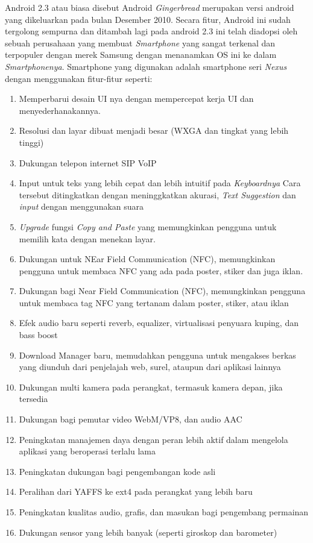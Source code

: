 \begin{enumerate}
Android 2.3 atau biasa disebut Android \textit{Gingerbread} merupakan versi android yang dikeluarkan pada bulan Desember 2010. Secara fitur, Android ini sudah tergolong sempurna dan ditambah lagi pada android 2.3 ini telah diadopsi oleh sebuah perusahaan yang membuat \textit{Smartphone} yang sangat terkenal dan terpopuler dengan merek Samsung dengan menanamkan OS ini ke dalam \textit{Smartphonenya}. Smartphone yang digunakan adalah smartphone seri \textit{Nexus} dengan menggunakan fitur-fitur seperti:
\begin{enumerate} 
    \item Memperbarui desain UI nya dengan mempercepat kerja UI dan menyederhanakannya.
    \item Resolusi dan layar dibuat menjadi besar (WXGA dan tingkat yang lebih tinggi)
    \item Dukungan telepon internet SIP VoIP
    \item Input untuk teks yang lebih cepat dan lebih intuitif pada \textit{Keyboardnya} Cara tersebut ditingkatkan dengan meninggkatkan akurasi, \textit{Text Suggestion} dan  \textit{input} dengan menggunakan suara
    \item \textit{Upgrade} fungsi \textit{Copy and Paste} yang memungkinkan pengguna untuk memilih kata dengan menekan layar. 
    \item Dukungan untuk NEar Field Communication (NFC), memungkinkan pengguna untuk membaca NFC yang ada pada poster, stiker dan juga iklan. 
    \item Dukungan bagi Near Field Communication (NFC), memungkinkan pengguna untuk membaca tag NFC yang tertanam dalam poster, stiker, atau iklan
    \item Efek audio baru seperti reverb, equalizer, virtualisasi penyuara kuping, dan bass boost
    \item Download Manager baru, memudahkan pengguna untuk mengakses berkas yang diunduh dari penjelajah web, surel, ataupun dari aplikasi lainnya
    \item Dukungan multi kamera pada perangkat, termasuk kamera depan, jika tersedia
    \item Dukungan bagi pemutar video WebM/VP8, dan audio AAC
    \item Peningkatan manajemen daya dengan peran lebih aktif dalam mengelola aplikasi yang beroperasi terlalu lama
    \item Peningkatan dukungan bagi pengembangan kode asli
    \item Peralihan dari YAFFS ke ext4 pada perangkat yang lebih baru
    \item Peningkatan kualitas audio, grafis, dan masukan bagi pengembang permainan
    \item Dukungan sensor yang lebih banyak (seperti giroskop dan barometer)
\end{enumerate}


\end{enumerate}
